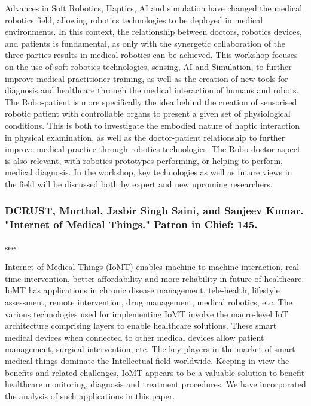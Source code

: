 \documentclass[conference]{IEEEtran}
\begin{document}
Advances in Soft Robotics, Haptics, AI and simulation have changed the medical robotics field, allowing robotics technologies to be deployed in medical environments. In this context, the relationship between doctors, robotics devices, and patients is fundamental, as only with the synergetic collaboration of the three parties results in medical robotics can be achieved. This workshop focuses on the use of soft robotics technologies, sensing, AI and Simulation, to further improve medical practitioner training, as well as the creation of new tools for diagnosis and healthcare through the medical interaction of humans and robots. The Robo-patient is more specifically the idea behind the creation of sensorised robotic patient with controllable organs to present a given set of physiological conditions. This is both to investigate the embodied nature of haptic interaction in physical examination, as well as the doctor-patient relationship to further improve medical practice through robotics technologies. The Robo-doctor aspect is also relevant, with robotics prototypes performing, or helping to perform, medical diagnosis. In the workshop, key technologies as well as future views in the field will be discussed both by expert and new upcoming researchers.

\medskip
\subsubsection{DCRUST, Murthal, Jasbir Singh Saini, and Sanjeev Kumar. "Internet of Medical Things." Patron in Chief: 145.}
see \cite{dcrustinternet}

Internet of Medical Things (IoMT) enables machine to machine interaction, real time
intervention, better affordability and more reliability in future of healthcare. IoMT has
applications in chronic disease management, tele-health, lifestyle assessment, remote
intervention, drug management, medical robotics, etc. The various technologies used for
implementing IoMT involve the macro-level IoT architecture comprising layers to enable
healthcare solutions. These smart medical devices when connected to other medical devices
allow patient management, surgical intervention, etc. The key players in the market of smart
medical things dominate the Intellectual field worldwide. Keeping in view the benefits and
related challenges, IoMT appears to be a valuable solution to benefit healthcare monitoring,
diagnosis and treatment procedures. We have incorporated the analysis of such applications in
this paper.
\end{document}

